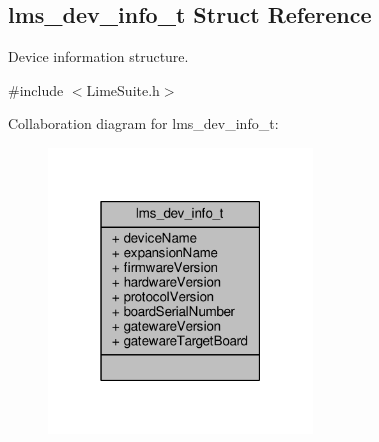 \subsection{lms\+\_\+dev\+\_\+info\+\_\+t Struct Reference}
\label{structlms__dev__info__t}


Device information structure.  




{\ttfamily \#include $<$Lime\+Suite.\+h$>$}



Collaboration diagram for lms\+\_\+dev\+\_\+info\+\_\+t\+:
\nopagebreak
\begin{figure}[H]
\begin{center}
\leavevmode
\includegraphics[width=199pt]{d6/d77/structlms__dev__info__t__coll__graph}
\end{center}
\end{figure}

